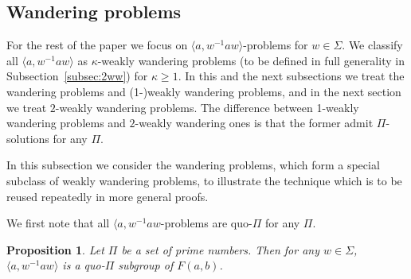 \documentclass[11pt]{amsart}
\newtheorem{proposition}[theorem]{Proposition}
\theoremstyle{definition}
\theoremstyle{definition}
\numberwithin{equation}{section}
\begin{document}
\subsection{Wandering problems}

For the rest of the paper we focus on $\langle a, w^{-1}aw\rangle$-problems for $w\in \Sigma$. We classify all $\langle a, w^{-1}aw\rangle$ as $\kappa$-weakly wandering problems (to be defined in full generality in Subsection~\ref{subsec:2ww}) for $\kappa\geq 1$. In this and the next subsections we treat the wandering problems and (1-)weakly wandering problems, and in the next section we treat $2$-weakly wandering problems. The difference between 1-weakly wandering problems and $2$-weakly wandering ones is that the former admit $\Pi$-solutions for any $\Pi$.

In this subsection we consider the wandering problems, which form a special subclass of weakly wandering problems, to illustrate the technique which is to be reused repeatedly in more general proofs.



We first note that all $\langle a, w^{-1}aw$-problems are quo-$\Pi$ for any $\Pi$.

\begin{proposition} Let $\Pi$ be a set of prime numbers. Then for any $w\in \Sigma$, $\langle a, w^{-1}aw\rangle$ is a quo-$\Pi$ subgroup of $F(a, b)$.
\end{proposition}
\end{document}
